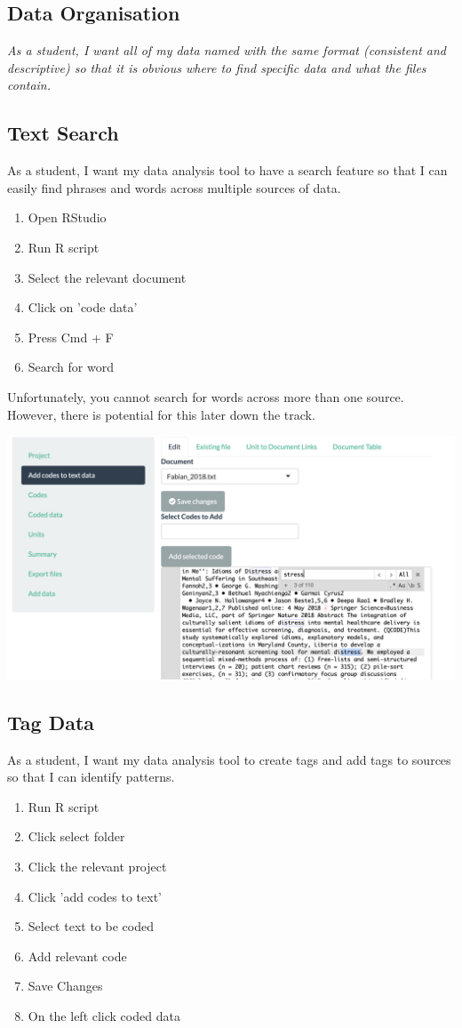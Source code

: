 \documentclass{article}
\begin{document}
\subsection{Data Organisation}
\begin{center}\textit{As a student, I want all of my data named with the same format (consistent and descriptive) so that it is obvious where to find specific data and what the files contain.}
\end{center}

\subsection{Text Search}
As a student, I want my data analysis tool to have a search feature so that I can easily find phrases and words across multiple sources of data.
\begin{enumerate}
\item Open RStudio 
\item Run R script 
\item Select the relevant document 
\item Click on 'code data' 
\item Press Cmd + F
\item Search for word 
\end{enumerate}
Unfortunately, you cannot search for words across more than one source. However, there is potential for this later down the track.

\includegraphics[width=\textwidth]{text-search.png}

\subsection{Tag Data}
As a student, I want my data analysis tool to create tags and add tags to sources so that I can identify patterns.
\begin{enumerate}
\item Run R script
\item Click select folder 
\item Click the relevant project 
\item Click 'add codes to text'
\item Select text to be coded
\item Add relevant code
\item Save Changes 
\item On the left click coded data
\end{enumerate}
\end{document}
